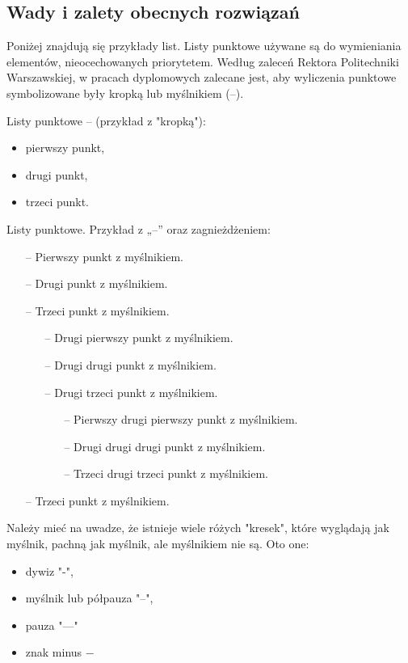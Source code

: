 \subsection{Wady i zalety obecnych rozwiązań}
\noindent Poniżej znajdują się przykłady list. Listy punktowe używane są do wymieniania elementów, 
nieocechowanych priorytetem. Według zaleceń Rektora Politechniki Warszawskiej, w pracach
dyplomowych zalecane jest, aby wyliczenia punktowe symbolizowane były kropką
lub myślnikiem (--).

\noindent Listy punktowe -- (przykład z "kropką"):
\begin{itemize}
    \item pierwszy punkt,
    \item drugi punkt,
    \item trzeci punkt.
\end{itemize}

\noindent Listy punktowe. Przykład z „--” oraz zagnieżdżeniem:
\begin{itemize}[label=---]
    \item[--] Pierwszy punkt z myślnikiem.
    \item[--] Drugi punkt z myślnikiem.
    \item[--] Trzeci punkt z myślnikiem.
    \begin{itemize}
        \item[--] Drugi pierwszy punkt z myślnikiem.
        \item[--] Drugi drugi punkt z myślnikiem.
        \item[--] Drugi trzeci punkt z myślnikiem.
        \begin{itemize}
            \item[--] Pierwszy drugi pierwszy punkt z myślnikiem.
            \item[--] Drugi drugi drugi punkt z myślnikiem.
            \item[--] Trzeci drugi trzeci punkt z myślnikiem.
        \end{itemize}    
    \end{itemize} 
    
    \item[--] Trzeci punkt z myślnikiem.
\end{itemize}

\noindent Należy mieć na uwadze, że istnieje wiele różych "kresek", które wyglądają jak 
myślnik, pachną jak myślnik, ale myślnikiem nie są. Oto one:
\begin{itemize}[label=--]
    \item dywiz "-",
    \item myślnik lub półpauza "--",
    \item pauza "---"
    \item znak minus $-$
\end{itemize}   

